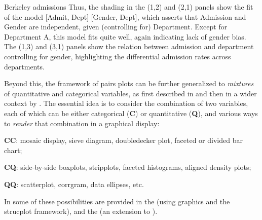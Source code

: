\documentclass[10pt,krantz2]{krantz}\usepackage[]{graphicx}\usepackage[]{color}
\newenvironment{knitrout}{}{} %
\renewenvironment{knitrout}{\small\renewcommand{\baselinestretch}{.85}}{} %
\begin{document}
\begin{Example}[berkeley4b]{Berkeley admissions}
\begin{knitrout}
\end{knitrout}
Thus, the shading in the (1,2) and (2,1) panels show the fit of the model
[Admit, Dept] [Gender, Dept],
which asserts that Admission and Gender are independent, given (controlling
for) Department.  Except for Department A, this model fits quite well,
again indicating lack of gender bias.
The (1,3) and (3,1) panels show the relation between admission and department
controlling for gender, highlighting the differential admission rates
across departments.

\end{Example}

Beyond this, the framework of pairs plots can be further generalized to \emph{mixtures}
of quantitative and categorical variables, as first described in \citet{Friendly:03:apa}
and then in a wider context by \citet{Emerson-etal:2013,Friendly:2013:genpairs}.
The essential idea is to consider the combination of two variables, each of which can
be either categorical (\textbf{C}) or quantitative (\textbf{Q}), and various ways to \emph{render} that
combination in a graphical display:

\begin{description*}
  \item[\textbf{CC}:] mosaic display, sieve diagram, doubledecker plot, faceted or divided bar chart;
  \item[\textbf{CQ}:] side-by-side boxplots, stripplots, faceted histograms, aligned density plots;
  \item[\textbf{QQ}:] scatterplot, corrgram, data ellipses, etc.
\end{description*}
In \R some of these possibilities are provided in the  (using  graphics
and the  strucplot framework), and the 
(an extension to ).
\end{document}
